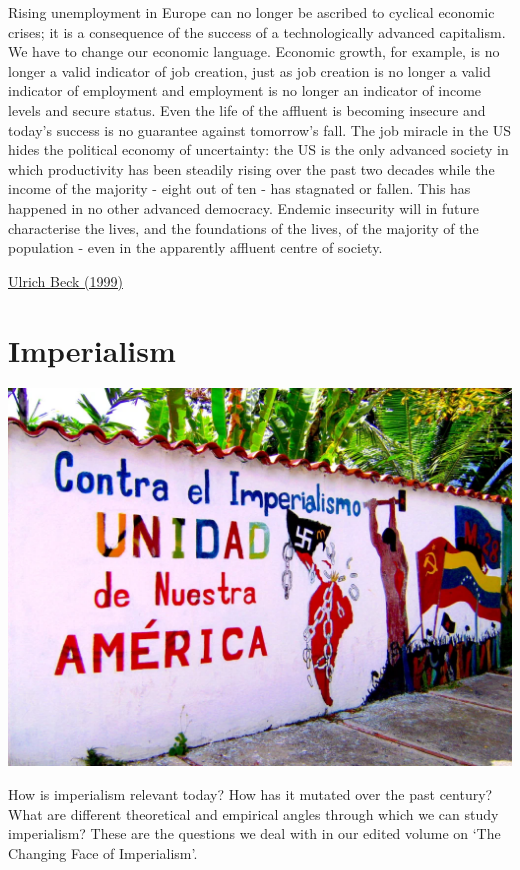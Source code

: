 \documentclass[
]{book}
\begin{document}
Rising unemployment in Europe can no longer be ascribed to cyclical economic crises; it is a consequence of the success of a technologically advanced capitalism. We have to change our economic language. Economic growth, for example, is no longer a valid indicator of job creation, just as job creation is no longer a valid indicator of employment and employment is no longer an indicator of income levels and secure status. Even the life of the affluent is becoming insecure and today's success is no guarantee against tomorrow's fall. The job miracle in the US hides the political economy of uncertainty: the US is the only advanced society in which productivity has been steadily rising over the past two decades while the income of the majority - eight out of ten - has stagnated or fallen. This has happened in no other advanced democracy. Endemic insecurity will in future characterise the lives, and the foundations of the lives, of the majority of the population - even in the apparently affluent centre of society.

\href{https://www.newstatesman.com/node/148758}{Ulrich Beck (1999)}

\hypertarget{imperialism}{%
\chapter{Imperialism}\label{imperialism}}

\includegraphics{fig/imperialism_mural.png}

How is imperialism relevant today? How has it mutated over the past century? What are different theoretical and empirical angles through which we can study imperialism? These are the questions we deal with in our edited volume on `The Changing Face of Imperialism'.
\end{document}

